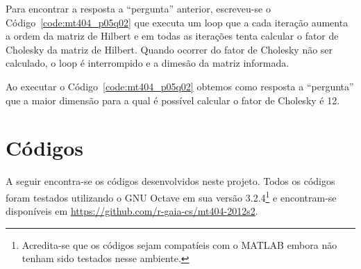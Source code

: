 \documentclass[12pt,a4paper]{article}
\begin{document}
Para encontrar a resposta a ``pergunta'' anterior, escreveu-se o
Código~\ref{code:mt404_p05q02} que executa um loop que a cada iteração aumenta a
ordem da matriz de Hilbert e em todas as iterações tenta calcular o fator de
Cholesky da matriz de Hilbert. Quando ocorrer do fator de Cholesky não ser
calculado, o loop é interrompido e a dimesão da matriz informada.

Ao executar o Código~\ref{code:mt404_p05q02} obtemos como resposta a
``pergunta'' que a maior dimensão para a qual é possível calcular o fator de
Cholesky é 12.

\section{C\'{o}digos}
A seguir encontra-se os c\'{o}digos desenvolvidos neste projeto. Todos os c\'{o}digos
foram testados utilizando o GNU Octave em sua vers\~{a}o
3.2.4\footnote{Acredita-se que os c\'{o}digos sejam compat\'{i}eis com o MATLAB
embora n\~{a}o tenham sido testados nesse ambiente.} e encontram-se
dispon\'{i}veis em \url{https://github.com/r-gaia-cs/mt404-2012s2}.


\end{document}
